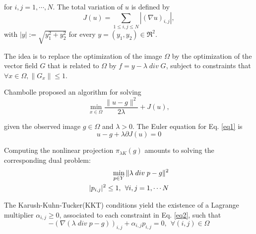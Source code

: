 \documentclass[11pt]{article}
\begin{document}
for $i,j = 1, \cdots, N$. The total variation of $u$ is defined by
\vspace{-5pt}
\begin{equation*}
J(u)  = \sum\limits_{1 \le i,j \le N} | (\nabla u)_{i,j} |,
\end{equation*}
with $|y| := \sqrt{y_{1}^2 + y_{2}^2}$ for every $y = (y_1, y_2) \in \Re^2$.

\par The idea is to replace the optimization of the image $\Omega$ by the optimization of the vector field $G$ that is related to $\Omega$ by $f = y - \lambda \; div \; G$, subject to constraints that $\forall x \in \Omega,  \| G_x\| \le 1$.

\par Chambolle proposed an algorithm for solving 
\vspace{-5pt}
\begin{equation}
 \min\limits_{x \in \Omega} \frac{ \| u - g\|^2 }{2\lambda} + J(u),
 \label{eq1}
\end{equation}

given the observed image $g \in \Omega$ and $\lambda > 0$. The Euler equation for Eq. \ref{eq1} is 
\vspace{-5pt}
\begin{equation*}
u - g + \lambda \partial J(u) = 0
\end{equation*}

Computing the nonlinear projection $\pi_{\lambda K}(g)$ amounts to solving the corresponding dual problem:
\vspace{-5pt}
\begin{eqnarray}
  \min\limits_{p \in Y} \| \lambda \; div \; p - g\|^2 \\
    |p_{i,j}|^2 \le 1, \: \: \forall i,j = 1, \cdots N \notag
 \label{eq2}
\end{eqnarray}

The Karush-Kuhn-Tucker(KKT) conditions yield the existence of a Lagrange multiplier $\alpha_{i,j} \ge 0$, associated to each constraint in Eq. \ref{eq2}, such that 
\vspace{-5pt}
\begin{equation*}
-(\nabla(\lambda \; div \; p - g))_{i,j} + \alpha_{i,j} p_{i,j} = 0, \: \: \forall (i,j) \in \Omega
\end{equation*}
\end{document}
